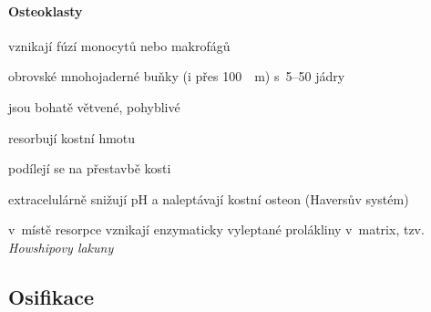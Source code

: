 \documentclass[DIV=8]{scrreprt}
\begin{document}
\paragraph{Osteoklasty}
\begin{myItemize}[nosep]
    \item vznikají fúzí monocytů nebo makrofágů
    \item obrovské mnohojaderné buňky (i přes \si{100 \mu m}) s 5--50 jádry
    \item jsou bohatě větvené, pohyblivé
    \item resorbují kostní hmotu
    \item podílejí se na přestavbě kosti
    \item extracelulárně snižují pH a naleptávají kostní osteon (Haversův systém)
\begin{myItemize}[nosep]
    \item v místě resorpce vznikají enzymaticky vyleptané prolákliny v matrix, tzv. \emph{Howshipovy lakuny}
\end{myItemize}

\end{myItemize}



\subsection{Osifikace} \label{Osifikace}


\end{document}
